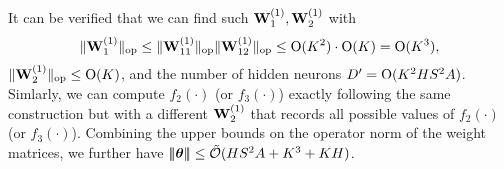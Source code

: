 It can be verified that we can find such ${\mathbf W}_1^{(1)},{\mathbf W}_2^{(1)}$ with $$\|{{\mathbf W}_1^{(1)}}\|_{\mathrm{op}}\leq \|{{\mathbf W}_{11}^{(1)}}\|_{\mathrm{op}}\|{{\mathbf W}_{12}^{(1)}}\|_{\mathrm{op}}\leq {\mathrm{O}}({K}^2)\cdot {\mathrm{O}}({K})={\mathrm{O}}({K}^3),$$ $\|{{\mathbf W}_2^{(1)}}\|_{\mathrm{op}}\leq {\mathrm{O}}({K})
$, and the number of hidden neurons ${D'}={\mathrm{O}}({K}^2{H}{S}^2{A})$. Simlarly, we can compute $f_2(\cdot)$ (or $f_3(\cdot)$) exactly following the same construction but with a different ${\mathbf W}_2^{(1)}$ that records all possible values of  $f_2(\cdot)$ (or $f_3(\cdot)$). Combining the upper bounds on the operator norm of the  weight matrices, we further have ${\left|\!\left|\!\left|{{{\boldsymbol \theta}}}\right|\!\right|\!\right|}\leq{\tilde{\mathcal O}}({H}{S}^2{A}+{K}^3+{K}{H})$. 















